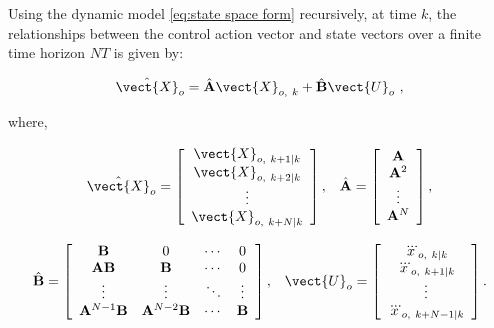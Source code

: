 Using the dynamic model \eqref{eq:state space form} recursively, at time $k$, the relationships between the control action vector and state vectors over a finite time horizon $NT$ is given by:
\begin{singlespace}
\begin{equation}\label{eq:state space form N horizon}
\hat{\vect{X}}_o =\hat{\mathbf{A}}\vect{X}_{o,~k}+\hat{\mathbf{B}}\vect{U}_o ~,
\end{equation}
\end{singlespace}

\noindent where,
\begin{singlespace}
\begin{equation*}
\begin{array}{cc}
\hat{\vect{X}}_o = \left[\begin{array}{c} \vect{X}_{o,~k+1\vert k} \\ \vect{X}_{o,~k+2\vert k} \\ \vdots \\ \vect{X}_{o,~k+N\vert k} \end{array} \right], &
\hat{\mathbf{A}} = \left[\begin{array}{c} \mathbf{A} \\ \mathbf{A}^2 \\ \vdots \\ \mathbf{A}^N \end{array} \right],
\end{array}
\end{equation*}
\end{singlespace}


\begin{singlespace}
\begin{equation*}
\begin{array}{cc}
\hat{\mathbf{B}} = \left[\begin{array}{cccc} \mathbf{B} & 0 & \cdots & 0 \\
\mathbf{A}\mathbf{B} & \mathbf{B} & \cdots & 0 \\ \vdots & \vdots & \ddots & \vdots \\ \mathbf{A}^{N-1}\mathbf{B} & \mathbf{A}^{N-2}\mathbf{B} & \cdots & \mathbf{B} \end{array} \right], &
\vect{U}_o =  \left[\begin{array}{c} \dddot{x}_{o,~k\vert k} \\ \dddot{x}_{o,~k+1\vert k} \\ \vdots \\ \dddot{x}_{o,~k+N-1\vert k} \end{array} \right].
\end{array}
\end{equation*}
\end{singlespace}


